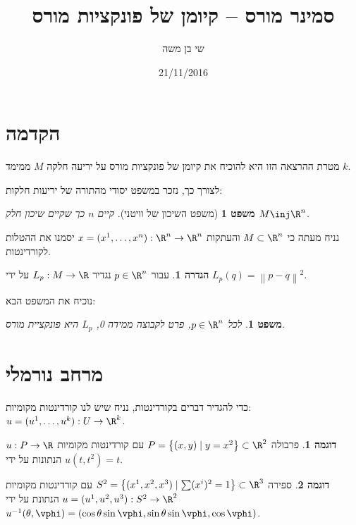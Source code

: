 \documentclass{article}
\title{סמינר מורס – קיומן של פונקציות מורס}
\author{שי בן משה}
\date{21/11/2016}
\newtheorem{theorem}{משפט}
\newtheorem*{theorem*}{משפט}
\theoremstyle{definition}
\newtheorem*{definition*}{הגדרה}
\newtheorem*{example*}{דוגמה}
\newcommand{\norm}[1]{\left\lVert#1\right\rVert}
\begin{document}
	\maketitle
	
	
	
	
	\section{הקדמה}
	
	מטרת ההרצאה הזו היא להוכיח את קיומן של פונקציות מורס על יריעה חלקה \(M\) ממימד \(k\).
	
	לצורך כך, נזכר במשפט יסודי מהתורה של יריעות חלקות:
	\begin{theorem*}[משפט השיכון של וויטני]
		קיים \(n\) כך שקיים שיכון חלק
		\(M \inj \R^n\).
	\end{theorem*}
	נניח מעתה כי 
	\(M \subset \R^n\)
	והעתקות
	\(x=(x^1,\dotsc,x^n): \R^n \to \R^n\)
	יסמנו את ההטלות לקורדינטות.
	
	\begin{definition*}
		עבור
		\(p\in \R^n\)
		נגדיר
		\(L_p:M\to \R\)
		על ידי
		\(L_p(q)=\norm{p-q}^2\).
	\end{definition*}

	נוכיח את המשפט הבא:
	\begin{theorem}\label{main-thm}
		לכל
		\(p\in \R^n\),
		פרט לקבוצה ממידה 0, \(L_p\) היא פונקציית מורס.
	\end{theorem}




	\section{מרחב נורמלי}
	
	כדי להגדיר דברים בקורדינטות, נניח שיש לנו קורדינטות מקומיות:
	\(u=(u^1,\dotsc,u^k): U \to \R^k\).
	
	\begin{example*}
		פרבולה
		\(P = \left\{(x,y) \mid y=x^2 \right\} \subset \R^2 \)
		עם קורדינטות מקומיות
		\(u: P \to \R\)
		הנתונות על ידי
		\(u(t,t^2)=t\).
	\end{example*}

	\begin{example*}
		ספירה
		\(S^2 = \left\{(x^1,x^2,x^3) \mid \sum (x^i)^2 = 1 \right\} \subset \R^3 \)
		עם קורדינטות מקומיות
		\(u=(u^1,u^2,u^3): S^2 \to \R^2\)
		הנתונת על ידי
		\(
			u^{-1}(\theta, \vphi) = \left(
				\cos\theta \sin\vphi,
				\sin\theta \sin\vphi,
				\cos\vphi
			\right)
		\).
	\end{example*}
	
\end{document}
